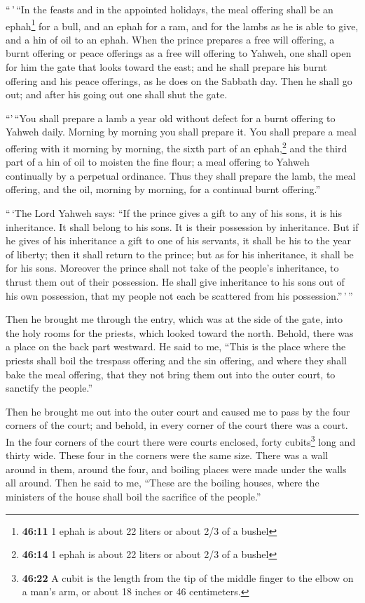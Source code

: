  ``\,'\,``In the feasts and in the appointed holidays,
the meal offering shall be an ephah\footnote{\textbf{46:11} 1 ephah is
  about 22 liters or about 2/3 of a bushel} for a bull, and an ephah for
a ram, and for the lambs as he is able to give, and a hin of oil to an
ephah.  When the prince prepares a free will offering, a
burnt offering or peace offerings as a free will offering to Yahweh, one
shall open for him the gate that looks toward the east; and he shall
prepare his burnt offering and his peace offerings, as he does on the
Sabbath day. Then he shall go out; and after his going out one shall
shut the gate.

 ``'\,``You shall prepare a lamb a year old without
defect for a burnt offering to Yahweh daily. Morning by morning you
shall prepare it.  You shall prepare a meal offering with
it morning by morning, the sixth part of an ephah,\footnote{\textbf{46:14}
  1 ephah is about 22 liters or about 2/3 of a bushel} and the third
part of a hin of oil to moisten the fine flour; a meal offering to
Yahweh continually by a perpetual ordinance.  Thus they
shall prepare the lamb, the meal offering, and the oil, morning by
morning, for a continual burnt offering.''

 ``\,`The Lord Yahweh says: ``If the prince gives a gift
to any of his sons, it is his inheritance. It shall belong to his sons.
It is their possession by inheritance.  But if he gives
of his inheritance a gift to one of his servants, it shall be his to the
year of liberty; then it shall return to the prince; but as for his
inheritance, it shall be for his sons.  Moreover the
prince shall not take of the people's inheritance, to thrust them out of
their possession. He shall give inheritance to his sons out of his own
possession, that my people not each be scattered from his
possession.''\,'\,''

 Then he brought me through the entry, which was at the
side of the gate, into the holy rooms for the priests, which looked
toward the north. Behold, there was a place on the back part westward.
 He said to me, ``This is the place where the priests
shall boil the trespass offering and the sin offering, and where they
shall bake the meal offering, that they not bring them out into the
outer court, to sanctify the people.''

 Then he brought me out into the outer court and caused
me to pass by the four corners of the court; and behold, in every corner
of the court there was a court.  In the four corners of
the court there were courts enclosed, forty cubits\footnote{\textbf{46:22}
  A cubit is the length from the tip of the middle finger to the elbow
  on a man's arm, or about 18 inches or 46 centimeters.} long and thirty
wide. These four in the corners were the same size. 
There was a wall around in them, around the four, and boiling places
were made under the walls all around.  Then he said to
me, ``These are the boiling houses, where the ministers of the house
shall boil the sacrifice of the people.''


